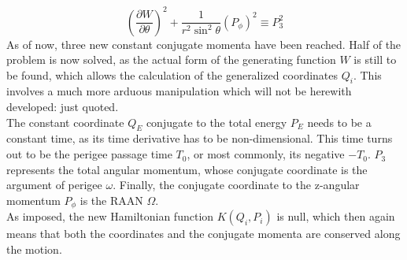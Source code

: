 %
\begin{equation}
\left(\dfrac{\partial W}{\partial \theta}\right)^2 + \dfrac{1}{r^2 \sin^2 \theta} \left(P_{\phi} \right)^2 \equiv P_3^2
\end{equation}
%
\indent As of now, three new constant conjugate momenta have been reached. Half of the problem is now solved, as the actual form of the generating function $W$ is still to be found, which allows the calculation of the generalized coordinates $Q_i$. This involves a much more arduous manipulation which will not be herewith developed: just quoted. \\
%
\indent The constant coordinate $Q_E$ conjugate to the total energy $P_E$ needs to be a constant time, as its time derivative has to be non-dimensional. This time turns out to be the perigee passage time $T_0$, or most commonly, its negative $- T_0$. $P_3$ represents the total angular momentum, whose conjugate coordinate is the argument of perigee $\omega$. Finally, the conjugate coordinate to the z-angular momentum $P_{\phi}$ is the RAAN $\Omega$.\\
%
\indent As imposed, the new Hamiltonian function $K(Q_i, P_i)$ is null, which then again means that both the coordinates and the conjugate momenta are conserved along the motion.